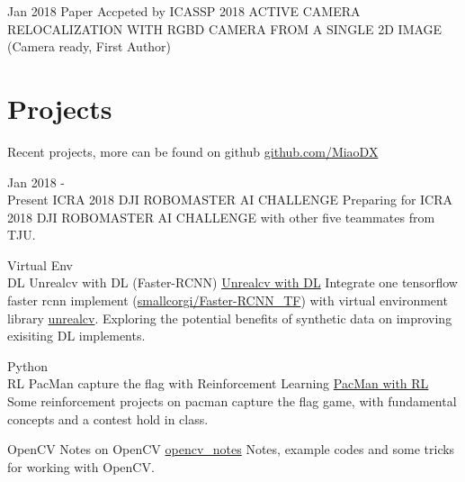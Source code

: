 \documentclass[letterpaper]{twentysecondcv} %
\begin{document}
\begin{twenty}
    \twentyitem
        {Jan 2018}
        {Paper Accpeted by ICASSP 2018}
        {}
        {}
        {ACTIVE CAMERA RELOCALIZATION WITH RGBD CAMERA
FROM A SINGLE 2D IMAGE (Camera ready, First Author)}
\end{twenty}

\section{Projects}
\begin{twenty}

    \twentyitem
        {}
        {Recent projects, more can be found on github}
        {\href{https://github.com/MiaoDX/}{github.com/MiaoDX}}
        {}
          {}
          
    \twentyitem
    {Jan 2018 - \\ Present}
    {ICRA 2018 DJI ROBOMASTER AI CHALLENGE}
    {}
    {}
    {Preparing for ICRA 2018 DJI ROBOMASTER AI CHALLENGE with other five teammates from TJU.}              
          
          
    \twentyitem
        {Virtual Env \\ DL}
        {Unrealcv with DL (Faster-RCNN)}
        {\href{https://github.com/MiaoDX/unrealcv_examples/}{Unrealcv with DL}}
        {}
        {Integrate one tensorflow faster rcnn implement (\href{https://github.com/smallcorgi/Faster-RCNN\_TF}{smallcorgi/Faster-RCNN\_TF}) with virtual environment library \href{https://github.com/unrealcv/unrealcv}{unrealcv}. Exploring the potential benefits of synthetic data on improving exisiting DL implements.}          
                 
    \twentyitem
        {Python \\ RL}
        {PacMan capture the flag with Reinforcement Learning}
        {\href{https://github.com/MiaoDX/hand_in_homework/tree/master/Advanced\_AI/}{PacMan with RL}}
        {}
        {Some reinforcement projects on pacman capture the flag game, with fundamental concepts and a contest hold in class.}


    \twentyitem
        {OpenCV}
        {Notes on OpenCV}
        {\href{https://github.com/MiaoDX/opencv\_projects/}{opencv\_notes}}
        {}
        {Notes, example codes and some tricks for working with OpenCV.}

\end{twenty}
\end{document}
